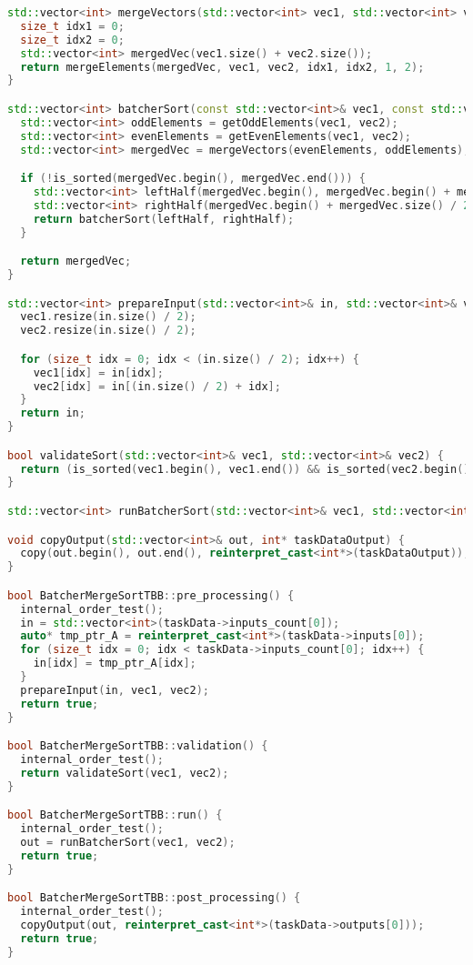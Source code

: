 \documentclass{report}
\begin{document}
\begin{lstlisting}[language=C++,caption=TBB версия]
std::vector<int> mergeVectors(std::vector<int> vec1, std::vector<int> vec2) {
  size_t idx1 = 0;
  size_t idx2 = 0;
  std::vector<int> mergedVec(vec1.size() + vec2.size());
  return mergeElements(mergedVec, vec1, vec2, idx1, idx2, 1, 2);
}

std::vector<int> batcherSort(const std::vector<int>& vec1, const std::vector<int>& vec2) {
  std::vector<int> oddElements = getOddElements(vec1, vec2);
  std::vector<int> evenElements = getEvenElements(vec1, vec2);
  std::vector<int> mergedVec = mergeVectors(evenElements, oddElements);

  if (!is_sorted(mergedVec.begin(), mergedVec.end())) {
    std::vector<int> leftHalf(mergedVec.begin(), mergedVec.begin() + mergedVec.size() / 2);
    std::vector<int> rightHalf(mergedVec.begin() + mergedVec.size() / 2, mergedVec.end());
    return batcherSort(leftHalf, rightHalf);
  }

  return mergedVec;
}

std::vector<int> prepareInput(std::vector<int>& in, std::vector<int>& vec1, std::vector<int>& vec2) {
  vec1.resize(in.size() / 2);
  vec2.resize(in.size() / 2);

  for (size_t idx = 0; idx < (in.size() / 2); idx++) {
    vec1[idx] = in[idx];
    vec2[idx] = in[(in.size() / 2) + idx];
  }
  return in;
}

bool validateSort(std::vector<int>& vec1, std::vector<int>& vec2) {
  return (is_sorted(vec1.begin(), vec1.end()) && is_sorted(vec2.begin(), vec2.end()));
}

std::vector<int> runBatcherSort(std::vector<int>& vec1, std::vector<int>& vec2) { return batcherSort(vec1, vec2); }

void copyOutput(std::vector<int>& out, int* taskDataOutput) {
  copy(out.begin(), out.end(), reinterpret_cast<int*>(taskDataOutput));
}

bool BatcherMergeSortTBB::pre_processing() {
  internal_order_test();
  in = std::vector<int>(taskData->inputs_count[0]);
  auto* tmp_ptr_A = reinterpret_cast<int*>(taskData->inputs[0]);
  for (size_t idx = 0; idx < taskData->inputs_count[0]; idx++) {
    in[idx] = tmp_ptr_A[idx];
  }
  prepareInput(in, vec1, vec2);
  return true;
}

bool BatcherMergeSortTBB::validation() {
  internal_order_test();
  return validateSort(vec1, vec2);
}

bool BatcherMergeSortTBB::run() {
  internal_order_test();
  out = runBatcherSort(vec1, vec2);
  return true;
}

bool BatcherMergeSortTBB::post_processing() {
  internal_order_test();
  copyOutput(out, reinterpret_cast<int*>(taskData->outputs[0]));
  return true;
}
\end{lstlisting}
\end{document}
